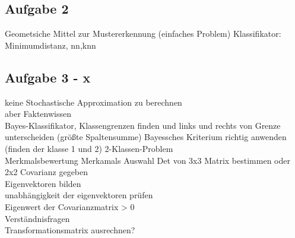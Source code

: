 \documentclass[a4paper,12pt]{scrreprt}
\begin{document}
\subsection{Aufgabe 2}
Geometsiche Mittel zur Mustererkennung (einfaches Problem)
Klassifikator: Minimumdistanz, nn,knn
\subsection{Aufgabe 3 - x}
keine Stochastische Approximation zu berechnen\\
aber Faktenwissen\\
Bayes-Klassifikator, Klassengrenzen finden und links und rechts von Grenze unterscheiden (größte Spaltensumme) Bayessches Kriterium richtig anwenden (finden der klasse 1 und 2)
2-Klassen-Problem
\\
Merkmalsbewertung Merkamals Auswahl
Det von 3x3 Matrix bestimmen oder 2x2  Covarianz gegeben\\
Eigenvektoren bilden\\
unabhängigkeit der eigenvektoren prüfen\\
Eigenwert der Covarianzmatrix > 0\\
Verständnisfragen\\
Transformationsmatrix ausrechnen?\\



\end{document}
